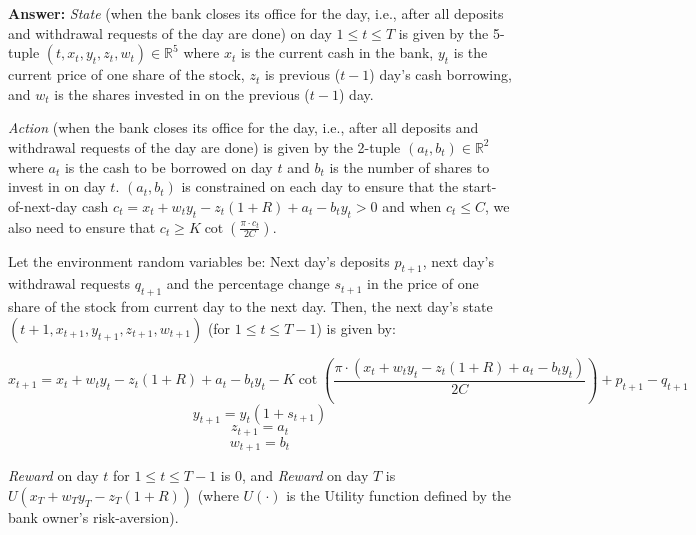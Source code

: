 \documentclass[12pt]{exam}
\begin{document}
\begin{questions}
{\bf Answer: } {\em State} (when the bank closes its office for the day, i.e., after all deposits and withdrawal requests of the day are done) on day $1\leq t \leq T$ is given by the 5-tuple $(t,x_t,y_t,z_t,w_t) \in \mathbb{R}^5$ where $x_t$ is the current cash in the bank, $y_t$ is the current price of one share of the stock, $z_t$ is previous ($t-1$) day's cash borrowing, and $w_t$ is the shares invested in on the previous ($t-1$) day.

{\em Action} (when the bank closes its office for the day, i.e., after all deposits and withdrawal requests of the day are done) is given by the 2-tuple $(a_t,b_t) \in \mathbb{R}^2$ where $a_t$ is the cash to be borrowed on day $t$ and $b_t$ is the number of shares to invest in on day $t$. $(a_t,b_t)$ is constrained on each day to ensure that the start-of-next-day cash $c_t  = x_t+w_ty_t - z_t(1+R) + a_t - b_ty_t > 0$ and when $c_t \leq C$, we also need to ensure that $c_t \geq K\cot(\frac {\pi \cdot c_t} {2C})$.

Let the environment random variables be: Next day's deposits $p_{t+1}$, next day's withdrawal requests $q_{t+1}$ and the percentage change $s_{t+1}$ in the price of one share of the stock from current day to the next day. Then, the next day's state $(t+1,x_{t+1},y_{t+1},z_{t+1},w_{t+1})$ (for $1\leq t \leq T-1$) is given by:

$$x_{t+1} = x_t + w_ty_t - z_t(1+R) + a_t - b_ty_t - K\cot(\frac {\pi \cdot (x_t + w_ty_t - z_t(1+R) + a_t - b_ty_t)} {2C}) + p_{t+1} - q_{t+1}$$
$$y_{t+1} = y_t(1+s_{t+1})$$
$$z_{t+1} = a_t$$
$$w_{t+1} = b_t$$

{\em Reward} on day $t$ for $1\leq t \leq T-1$ is 0, and {\em Reward} on day $T$ is $U(x_T + w_Ty_T - z_T(1+R))$ (where $U(\cdot)$ is the Utility function defined by the bank owner's risk-aversion).


\end{questions}
\end{document}
